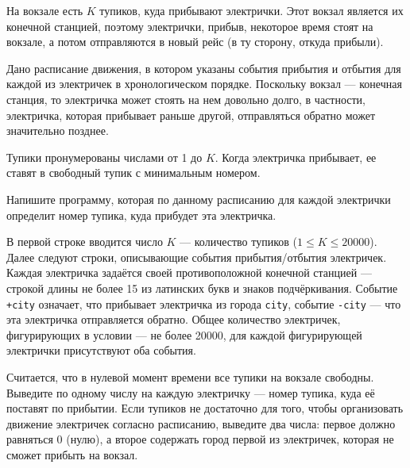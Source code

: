 На вокзале есть $K$ тупиков, куда прибывают электрички. Этот вокзал является их конечной станцией, поэтому электрички, прибыв, некоторое время стоят на вокзале, а потом отправляются в новый рейс (в ту сторону, откуда прибыли).

Дано расписание движения, в котором указаны события прибытия и отбытия для каждой из электричек в хронологическом порядке. Поскольку вокзал --- конечная станция, то электричка может стоять на нем довольно долго, в частности, электричка, которая прибывает раньше другой, отправляться обратно может значительно позднее.

Тупики пронумерованы числами от 1 до $K$. Когда электричка прибывает, ее ставят в свободный тупик с минимальным номером. 

Напишите программу, которая по данному расписанию для каждой электрички определит номер тупика, куда прибудет эта электричка. 

\InputFile
В первой строке вводится число $K$ --- количество тупиков ($1 \leq K \leq 20000$). Далее следуют строки, описывающие события прибытия/отбытия электричек. Каждая электричка задаётся своей противоположной конечной станцией --- строкой длины не более 15 из латинских букв и знаков подчёркивания. Событие \verb"+city" означает, что прибывает электричка из города \verb"city", событие \verb"-city" --- что эта электричка отправляется обратно. Общее количество электричек, фигурирующих в условии --- не более 20000, для каждой фигурирующей электрички присутствуют оба события.

Считается, что в нулевой момент времени все тупики на вокзале свободны. 
\OutputFile
Выведите по одному числу на каждую электричку --- номер тупика, куда её поставят по прибытии. Если тупиков не достаточно для того, чтобы организовать движение электричек согласно расписанию,  выведите два числа: первое должно равняться 0 (нулю), а второе содержать город первой из электричек, которая не сможет прибыть на вокзал.

